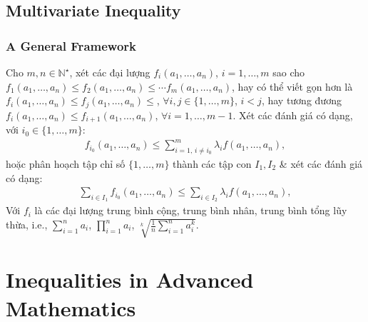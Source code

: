 \documentclass[oneside]{book}
\numberwithin{equation}{section}
\begin{document}

\chapter{Multivariate Inequality}

\section{A General Framework}
Cho $m,n\in\mathbb{N}^\star$, xét các đại lượng $f_i(a_1,\ldots,a_n)$, $i = 1,\ldots,m$ sao cho $f_1(a_1,\ldots,a_n)\le f_2(a_1,\ldots,a_n)\le\cdots f_m(a_1,\ldots,a_n)$, hay có thể viết gọn hơn là $f_i(a_1,\ldots,a_n)\le f_j(a_1,\ldots,a_n)\le$, $\forall i,j\in\{1,\ldots,m\}$, $i < j$, hay tương đương $f_i(a_1,\ldots,a_n)\le f_{i+1}(a_1,\ldots,a_n)$, $\forall i = 1,\ldots,m - 1$. Xét các đánh giá có dạng, với $i_0\in\{1,\ldots,m\}$:
\begin{align}
	f_{i_0}(a_1,\ldots,a_n)\le\sum_{i=1,\,i\ne i_0}^m \lambda_if(a_1,\ldots,a_n),
\end{align}
hoặc phân hoạch tập chỉ số $\{1,\ldots,m\}$ thành các tập con $I_1,I_2$ \& xét các đánh giá có dạng:
\begin{align}
	\sum_{i\in I_1} f_{i_0}(a_1,\ldots,a_n)\le\sum_{i\in I_2} \lambda_if(a_1,\ldots,a_n),
\end{align}
Với $f_i$ là các đại lượng trung bình cộng, trung bình nhân, trung bình tổng lũy thừa, i.e., $\sum_{i=1}^n a_i$, $\prod_{i=1}^n a_i$, $\sqrt[k]{\frac{1}{n}\sum_{i=1}^n a_i^k}$.


\part{Inequalities in Advanced Mathematics}



\printbibliography[heading=bibintoc]
	
\end{document}
